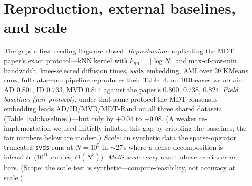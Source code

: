 \documentclass[10pt,twocolumn]{article}
\begin{document}
\section{Reproduction, external baselines, and scale}
The gaps a first reading flags are closed. \emph{Reproduction:} replicating the MDT paper's exact
protocol---kNN kernel with $k_{nn}{=}\lfloor\log N\rfloor$ and max-of-row-min bandwidth, knee-selected
diffusion times, \texttt{svds} embedding, AMI over 20 KMeans runs, full data---our pipeline reproduces
their Table~4: on 100Leaves we obtain AD $0.801$, ID $0.733$, MVD $0.814$ against the paper's $0.800$,
$0.738$, $0.824$. \emph{Field baselines (fair protocol):} under that same protocol the MDT consensus
embedding leads AD/ID/MVD/MDT-Rand on all three shared datasets (Table~\ref{tab:baselines})---but only
by $+0.04$ to $+0.08$. (A weaker re-implementation we used initially inflated this gap by crippling the
baselines; the fair numbers below are modest.) \emph{Scale:} on synthetic data the sparse-operator
truncated \texttt{svds} runs at $N{=}10^5$ in ${\sim}27$\,s where a dense decomposition is infeasible
($10^{10}$ entries, $O(N^3)$). \emph{Multi-seed:} every result above carries error bars. (Scope: the
scale test is synthetic---compute-feasibility, not accuracy at scale.)

\begin{table}[t]\centering\footnotesize
\caption{Clustering AMI under the MDT paper's exact protocol, which our pipeline reproduces (AD/ID/MVD
on 100Leaves match Table~4 within ${\sim}0.01$). MDT consensus leads on all three, by a modest
$+0.04$--$+0.08$.}
\label{tab:baselines}
\setlength{\tabcolsep}{5pt}
\end{table}
\end{document}
